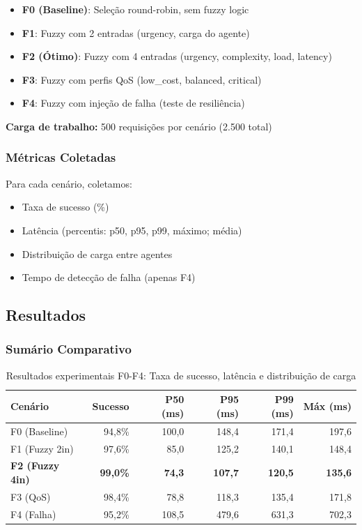 \begin{itemize}
  \item \textbf{F0 (Baseline)}: Seleção round-robin, sem fuzzy logic
  \item \textbf{F1}: Fuzzy com 2 entradas (urgency, carga do agente)
  \item \textbf{F2 (Ótimo)}: Fuzzy com 4 entradas (urgency, complexity, load, latency)
  \item \textbf{F3}: Fuzzy com perfis QoS (low\_cost, balanced, critical)
  \item \textbf{F4}: Fuzzy com injeção de falha (teste de resiliência)
\end{itemize}

\textbf{Carga de trabalho:} 500 requisições por cenário (2.500 total)

\subsubsection{Métricas Coletadas}

Para cada cenário, coletamos:
\begin{itemize}
  \item Taxa de sucesso (\%)
  \item Latência (percentis: p50, p95, p99, máximo; média)
  \item Distribuição de carga entre agentes
  \item Tempo de detecção de falha (apenas F4)
\end{itemize}

\subsection{Resultados}

\subsubsection{Sumário Comparativo}

\begin{table}[h]
\centering
\caption{Resultados experimentais F0-F4: Taxa de sucesso, latência e distribuição de carga}
\label{tab:fuzzy_results}
\begin{tabularx}{\textwidth}{|l|r|r|r|r|r|}
\hline
\textbf{Cenário} & \textbf{Sucesso} & \textbf{P50 (ms)} & \textbf{P95 (ms)} & \textbf{P99 (ms)} & \textbf{Máx (ms)} \\
\hline
F0 (Baseline) & 94,8\% & 100,0 & 148,4 & 171,4 & 197,6 \\
\hline
F1 (Fuzzy 2in) & 97,6\% & 85,0 & 125,2 & 140,1 & 148,4 \\
\hline
\textbf{F2 (Fuzzy 4in)} & \textbf{99,0\%} & \textbf{74,3} & \textbf{107,7} & \textbf{120,5} & \textbf{135,6} \\
\hline
F3 (QoS) & 98,4\% & 78,8 & 118,3 & 135,4 & 171,8 \\
\hline
F4 (Falha) & 95,2\% & 108,5 & 479,6 & 631,3 & 702,3 \\
\hline
\end{tabularx}
\end{table}

